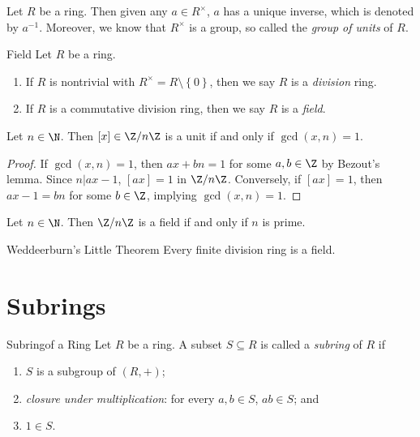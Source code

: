 \documentclass[pmath347]{subfiles}
\begin{document}
    \np Let $R$ be a ring. Then given any $a\in R^\times$, $a$ has a unique inverse, which is denoted by $a^{-1}$. Moreover, we know that $R^\times$ is a group, so called the \emph{group of units} of $R$.

    \begin{definition}{Field}{}
        Let $R$ be a ring.
        \begin{enumerate}
            \item If $R$ is nontrivial with $R^\times = R\setminus \left\lbrace 0 \right\rbrace$, then we say $R$ is a \emph{division} ring.
            \item If $R$ is a commutative division ring, then we say $R$ is a \emph{field}.
        \end{enumerate}
    \end{definition}

    \begin{prop}{}
        Let $n\in\N$. Then $\left[ x \right] \in \Z /n\Z$ is a unit if and only if $\gcd\left( x,n \right) = 1$.
    \end{prop}

    \begin{proof}
        If $\gcd\left( x,n \right) = 1$, then $ax+bn = 1$ for some $a,b\in\Z$ by Bezout's lemma. Since $n|ax-1$, $\left[ ax \right] = 1$ in $\Z /n\Z$. Conversely, if $\left[ ax \right] = 1$, then $ax-1 = bn$ for some $b\in \Z$, implying $\gcd\left( x,n \right) =1 $.
    \end{proof}

    \begin{cor}{}
        Let $n\in\N$. Then $\Z /n\Z$ is a field if and only if $n$ is prime.
    \end{cor}	

    \begin{theorem}{Weddeerburn's Little Theorem}
        Every finite division ring is a field.
    \end{theorem}

    \section{Subrings}

    \begin{definition}{Subring}{of a Ring}
        Let $R$ be a ring. A subset $S\subseteq R$ is called a \emph{subring} of $R$ if
        \begin{enumerate}
            \item $S$ is a subgroup of $\left( R,+ \right)$;
            \item \textit{closure under multiplication}: for every $a,b\in S$, $ab\in S$; and
            \item $1\in S$.
        \end{enumerate}
    \end{definition}
\end{document}
